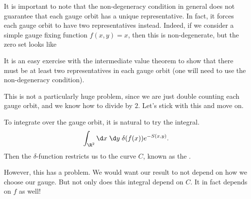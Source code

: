 \documentclass[a4paper]{article}
\begin{document}
It is important to note that the non-degeneracy condition in general does not guarantee that each gauge orbit has a unique representative. In fact, it forces each gauge orbit to have two representatives instead. Indeed, if we consider a simple gauge fixing function $f(x, y) = x$, then this is non-degenerate, but the zero set looks like
\begin{center}
\end{center}
It is an easy exercise with the intermediate value theorem to show that there must be at least two representatives in each gauge orbit (one will need to use the non-degeneracy condition).

This is not a particularly huge problem, since we are just double counting each gauge orbit, and we know how to divide by $2$. Let's stick with this and move on.

To integrate over the gauge orbit, it is natural to try the integral.
\[
  \int_{\R^2}\d x\; \d y\; \delta(f(x)) e^{-S(x, y)}.
\]
Then the $\delta$-function restricts us to the curve $C$, known as the .

However, this has a problem. We would want our result to not depend on how we choose our gauge. But not only does this integral depend on $C$. It in fact depends on $f$ as well!
\end{document}
